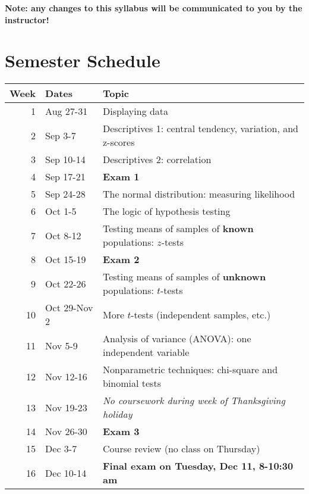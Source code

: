 \documentclass[10pt]{article}
\begin{document}
\textbf{Note:  any changes to this syllabus will be communicated to you by the instructor!}

\section*{Semester Schedule}
\label{sec:orgc5e0092}
\begin{center}
\begin{tabular}{rll}
Week & Dates & Topic\\
\hline
1 & Aug 27-31 & Displaying data\\
2 & Sep 3-7 & Descriptives 1: central tendency, variation, and z-scores\\
3 & Sep 10-14 & Descriptives 2: correlation\\
4 & Sep 17-21 & \textbf{Exam 1}\\
5 & Sep 24-28 & The normal distribution: measuring likelihood\\
6 & Oct 1-5 & The logic of hypothesis testing\\
7 & Oct 8-12 & Testing means of samples of \textbf{known} populations: \(z\)-tests\\
8 & Oct 15-19 & \textbf{Exam 2}\\
9 & Oct 22-26 & Testing means of samples of \textbf{unknown} populations: \(t\)-tests\\
10 & Oct 29-Nov 2 & More \(t\)-tests (independent samples, etc.)\\
11 & Nov 5-9 & Analysis of variance (ANOVA): one independent variable\\
12 & Nov 12-16 & Nonparametric techniques: chi-square and binomial tests\\
13 & Nov 19-23 & \emph{No coursework during week of Thanksgiving holiday}\\
14 & Nov 26-30 & \textbf{Exam 3}\\
15 & Dec 3-7 & Course review (no class on Thursday)\\
16 & Dec 10-14 & \textbf{Final exam on Tuesday, Dec 11, 8-10:30 am}\\
\end{tabular}
\end{center}
\end{document}
